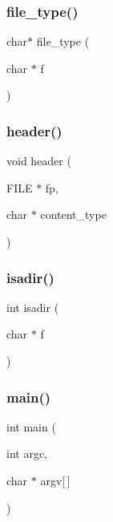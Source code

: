 \mbox{\label{10b-serwer_8c_a29b9ee72561809560e62a9ea307d1ff6}} 
\subsubsection{\texorpdfstring{file\_type()}{file\_type()}}
{\footnotesize\ttfamily char$\ast$ file\+\_\+type (\begin{DoxyParamCaption}\item[{char $\ast$}]{f }\end{DoxyParamCaption})}

\mbox{\label{10b-serwer_8c_adc7bfb1c892aecf61c0c73f3458caf90}} 
\subsubsection{\texorpdfstring{header()}{header()}}
{\footnotesize\ttfamily void header (\begin{DoxyParamCaption}\item[{F\+I\+LE $\ast$}]{fp,  }\item[{char $\ast$}]{content\+\_\+type }\end{DoxyParamCaption})}

\mbox{\label{10b-serwer_8c_a68ac50fc5196973b9f3ef7b4992f7279}} 
\subsubsection{\texorpdfstring{isadir()}{isadir()}}
{\footnotesize\ttfamily int isadir (\begin{DoxyParamCaption}\item[{char $\ast$}]{f }\end{DoxyParamCaption})}

\mbox{\label{10b-serwer_8c_a0ddf1224851353fc92bfbff6f499fa97}} 
\subsubsection{\texorpdfstring{main()}{main()}}
{\footnotesize\ttfamily int main (\begin{DoxyParamCaption}\item[{int}]{argc,  }\item[{char $\ast$}]{argv\mbox{[}$\,$\mbox{]} }\end{DoxyParamCaption})}

